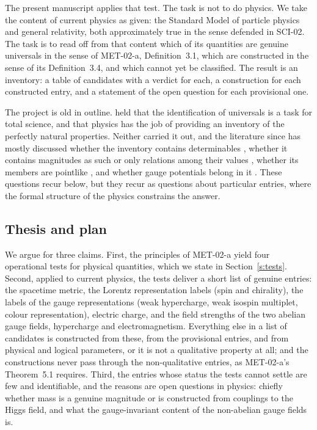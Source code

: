 \documentclass{situationist-preprint}
\begin{document}
The present manuscript applies that test. The task is not to do physics. We take the content of current physics as given: the Standard Model of particle physics \citep{Glashow1961,Weinberg1967} and general relativity, both approximately true in the sense defended in SCI-02. The task is to read off from that content which of its quantities are genuine universals in the sense of MET-02-a, Definition~3.1, which are constructed in the sense of its Definition~3.4, and which cannot yet be classified. The result is an inventory: a table of candidates with a verdict for each, a construction for each constructed entry, and a statement of the open question for each provisional one.

The project is old in outline. \citet{Armstrong1978} held that the identification of universals is a task for total science, and \citet{Lewis1983} that physics has the job of providing an inventory of the perfectly natural properties. Neither carried it out, and the literature since has mostly discussed whether the inventory contains determinables \citep{Wilson2012}, whether it contains magnitudes as such or only relations among their values \citep{Mundy1987,Dasgupta2013,Eddon2013}, whether its members are pointlike \citep{Butterfield2006}, and whether gauge potentials belong in it \citep{Healey2007,Maudlin2007}. These questions recur below, but they recur as questions about particular entries, where the formal structure of the physics constrains the answer.

\subsection{Thesis and plan}

We argue for three claims. First, the principles of MET-02-a yield four operational tests for physical quantities, which we state in Section~\ref{s:tests}. Second, applied to current physics, the tests deliver a short list of genuine entries: the spacetime metric, the Lorentz representation labels (spin and chirality), the labels of the gauge representations (weak hypercharge, weak isospin multiplet, colour representation), electric charge, and the field strengths of the two abelian gauge fields, hypercharge and electromagnetism. Everything else in a list of \vvNK{} candidates is constructed from these, from the provisional entries, and from physical and logical parameters, or it is not a qualitative property at all; and the constructions never pass through the non-qualitative entries, as MET-02-a's Theorem~5.1 requires. Third, the entries whose status the tests cannot settle are few and identifiable, and the reasons are open questions in physics: chiefly whether mass is a genuine magnitude or is constructed from couplings to the Higgs field, and what the gauge-invariant content of the non-abelian gauge fields is.
\end{document}
